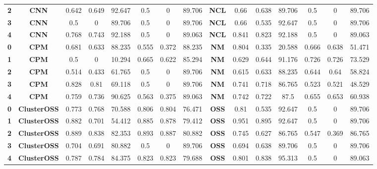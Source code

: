 {{\begin{tabular}{c|c|cccccc|ccccccc}
\textbf{2} & \textbf{CNN} & 0.642 & 0.649 & 92.647 & 0.5   & 0     & 89.706 & \multicolumn{1}{c|}{\textbf{NCL}} & 0.66  & 0.638 & 89.706 & 0.5   & 0     & 89.706 \\
\textbf{3} & \textbf{CNN} & 0.5   & 0     & 89.706 & 0.5   & 0     & 89.706 & \multicolumn{1}{c|}{\textbf{NCL}} & 0.66  & 0.535 & 92.647 & 0.5   & 0     & 89.706 \\
\textbf{4} & \textbf{CNN} & 0.768 & 0.743 & 92.188 & 0.5   & 0     & 89.063 & \multicolumn{1}{c|}{\textbf{NCL}} & 0.841 & 0.823 & 92.188 & 0.5   & 0     & 89.063 \\
\textbf{0} & \textbf{CPM} & 0.681 & 0.633 & 88.235 & 0.555 & 0.372 & 88.235 & \multicolumn{1}{c|}{\textbf{NM}} & 0.804 & 0.335 & 20.588 & 0.666 & 0.638 & 51.471 \\
\textbf{1} & \textbf{CPM} & 0.5   & 0     & 10.294 & 0.665 & 0.622 & 85.294 & \multicolumn{1}{c|}{\textbf{NM}} & 0.629 & 0.644 & 91.176 & 0.726 & 0.726 & 73.529 \\
\textbf{2} & \textbf{CPM} & 0.514 & 0.433 & 61.765 & 0.5   & 0     & 89.706 & \multicolumn{1}{c|}{\textbf{NM}} & 0.615 & 0.633 & 88.235 & 0.644 & 0.64  & 58.824 \\
\textbf{3} & \textbf{CPM} & 0.828 & 0.81  & 69.118 & 0.5   & 0     & 89.706 & \multicolumn{1}{c|}{\textbf{NM}} & 0.741 & 0.718 & 86.765 & 0.523 & 0.521 & 48.529 \\
\textbf{4} & \textbf{CPM} & 0.759 & 0.736 & 90.625 & 0.563 & 0.375 & 89.063 & \multicolumn{1}{c|}{\textbf{NM}} & 0.742 & 0.722 & 87.5  & 0.655 & 0.653 & 60.938 \\
\textbf{0} & \textbf{ClusterOSS} & 0.773 & 0.768 & 70.588 & 0.806 & 0.804 & 76.471 & \multicolumn{1}{c|}{\textbf{OSS}} & 0.81  & 0.535 & 92.647 & 0.5   & 0     & 89.706 \\
\textbf{1} & \textbf{ClusterOSS} & 0.882 & 0.701 & 54.412 & 0.885 & 0.878 & 79.412 & \multicolumn{1}{c|}{\textbf{OSS}} & 0.951 & 0.895 & 92.647 & 0.5   & 0     & 89.706 \\
\textbf{2} & \textbf{ClusterOSS} & 0.889 & 0.838 & 82.353 & 0.893 & 0.887 & 80.882 & \multicolumn{1}{c|}{\textbf{OSS}} & 0.745 & 0.627 & 86.765 & 0.547 & 0.369 & 86.765 \\
\textbf{3} & \textbf{ClusterOSS} & 0.704 & 0.691 & 80.882 & 0.5   & 0     & 89.706 & \multicolumn{1}{c|}{\textbf{OSS}} & 0.694 & 0.638 & 89.706 & 0.5   & 0     & 89.706 \\
\textbf{4} & \textbf{ClusterOSS} & 0.787 & 0.784 & 84.375 & 0.823 & 0.823 & 79.688 & \multicolumn{1}{c|}{\textbf{OSS}} & 0.801 & 0.838 & 95.313 & 0.5   & 0     & 89.063 \\

\end{tabular}}}
